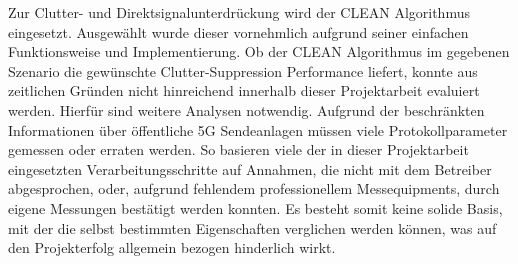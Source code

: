 Zur Clutter- und Direktsignalunterdrückung wird der CLEAN Algorithmus eingesetzt. Ausgewählt wurde dieser vornehmlich aufgrund seiner einfachen Funktionsweise und Implementierung. Ob der CLEAN Algorithmus im gegebenen Szenario die gewünschte Clutter-Suppression Performance liefert, konnte aus zeitlichen Gründen nicht hinreichend innerhalb dieser Projektarbeit evaluiert werden. Hierfür sind weitere Analysen notwendig. Aufgrund der beschränkten Informationen über öffentliche 5G Sendeanlagen müssen viele Protokollparameter gemessen oder erraten werden. So basieren viele der in dieser Projektarbeit eingesetzten Verarbeitungsschritte auf Annahmen, die nicht mit dem Betreiber abgesprochen, oder, aufgrund fehlendem professionellem Messequipments, durch eigene Messungen bestätigt werden konnten. Es besteht somit keine solide Basis, mit der die selbst bestimmten Eigenschaften verglichen werden können, was auf den Projekterfolg allgemein bezogen hinderlich wirkt.
